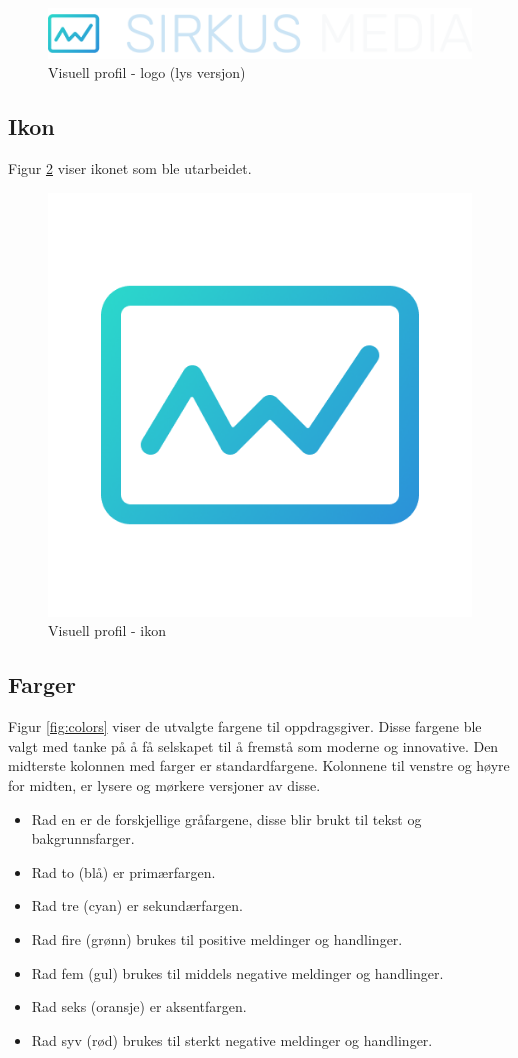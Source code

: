 \begin{figure}[H]
    \centering
    \includegraphics[width=.5\textwidth]{design/logo-light.png}
    \caption{Visuell profil - logo (lys versjon)}
    \label{fig:logo-light}
\end{figure}

\subsection{Ikon}
Figur \ref{fig:icon} viser ikonet som ble utarbeidet.

\begin{figure}[H]
    \centering
    \includegraphics[width=.25\textwidth]{design/logo-icon.png}
    \caption{Visuell profil - ikon}
    \label{fig:icon}
\end{figure}

\subsection{Farger}
Figur \ref{fig:colors} viser de utvalgte fargene til oppdragsgiver. Disse fargene ble valgt med tanke på å få selskapet til å fremstå som moderne og innovative.
Den midterste kolonnen med farger er standardfargene. Kolonnene til venstre og høyre for midten, er lysere og mørkere versjoner av disse.
\begin{itemize}
    \item Rad en er de forskjellige gråfargene, disse blir brukt til tekst og bakgrunnsfarger.
    \item Rad to (blå) er primærfargen.
    \item Rad tre (cyan) er sekundærfargen.
    \item Rad fire (grønn) brukes til positive meldinger og handlinger.
    \item Rad fem (gul) brukes til middels negative meldinger og handlinger.
    \item Rad seks (oransje) er aksentfargen.
    \item Rad syv (rød) brukes til sterkt negative meldinger og handlinger.
\end{itemize}

